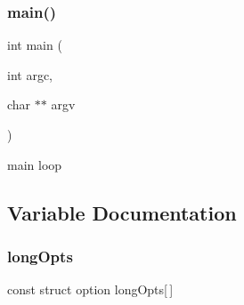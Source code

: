 \subsubsection{main()}
{\footnotesize\ttfamily int main (\begin{DoxyParamCaption}\item[{int}]{argc,  }\item[{char $\ast$$\ast$}]{argv }\end{DoxyParamCaption})}

main loop 

\subsection{Variable Documentation}
\mbox{\label{qbadmin_8c_a091f2d9683d6ef802780b360f66bad67}} 
\subsubsection{long\+Opts}
{\footnotesize\ttfamily const struct option long\+Opts[$\,$]\hspace{0.3cm}{\ttfamily [static]}}

